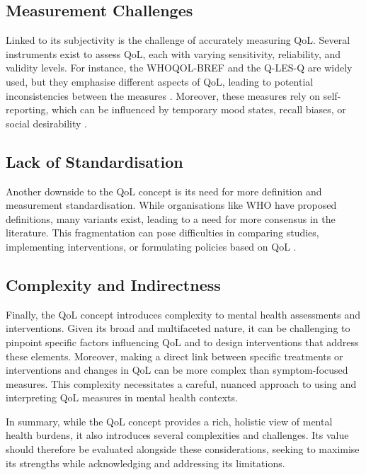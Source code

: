 \documentclass[10pt]{article}
\begin{document}
\begin{sloppypar}
  \subsection{Measurement Challenges}
  \label{subsec:measurement}
  Linked to its subjectivity is the challenge of accurately measuring QoL. Several instruments exist to assess QoL, each with varying sensitivity, reliability, and validity levels. For instance, the WHOQOL-BREF and the Q-LES-Q are widely used, but they emphasise different aspects of QoL, leading to potential inconsistencies between the measures \citep{endicott_quality_1993,harper_development_1998}. Moreover, these measures rely on self-reporting, which can be influenced by temporary mood states, recall biases, or social desirability \citep{bowling_just_2005}.

  \subsection{Lack of Standardisation}
  \label{subsec:standardisation}
  Another downside to the QoL concept is its need for more definition and measurement standardisation. While organisations like WHO have proposed definitions, many variants exist, leading to a need for more consensus in the literature. This fragmentation can pose difficulties in comparing studies, implementing interventions, or formulating policies based on QoL \citep{matarazzo_behavioral_1980}.

  \subsection{Complexity and Indirectness}
  \label{subsec:complexity}
  Finally, the QoL concept introduces complexity to mental health assessments and interventions. Given its broad and multifaceted nature, it can be challenging to pinpoint specific factors influencing QoL and to design interventions that address these elements. Moreover, making a direct link between specific treatments or interventions and changes in QoL can be more complex than symptom-focused measures. This complexity necessitates a careful, nuanced approach to using and interpreting QoL measures in mental health contexts.

  In summary, while the QoL concept provides a rich, holistic view of mental health burdens, it also introduces several complexities and challenges. Its value should therefore be evaluated alongside these considerations, seeking to maximise its strengths while acknowledging and addressing its limitations.


\end{sloppypar}
\end{document}
